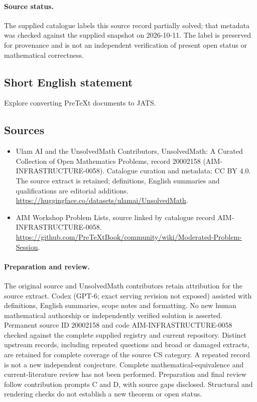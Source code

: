 \documentclass[11pt]{article}
\begin{document}
\paragraph{Source status.}
The supplied catalogue labels this source record partially solved; that metadata was checked against the supplied snapshot on 2026-10-11. The label is preserved for provenance and is not an independent verification of present open status or mathematical correctness.
\subsection{Short English statement}
Explore converting PreTeXt documents to JATS.
\subsection{Sources}
\begin{itemize}
\item[\hypertarget{source:20002158:1}{S1}] Ulam AI and the UnsolvedMath Contributors, UnsolvedMath: A Curated Collection of Open Mathematics Problems, record 20002158 (AIM-INFRASTRUCTURE-0058). Catalogue curation and metadata: CC BY 4.0. The source extract is retained; definitions, English summaries and qualifications are editorial additions.
\url{https://huggingface.co/datasets/ulamai/UnsolvedMath}.
\item[\hypertarget{source:20002158:2}{S2}] AIM Workshop Problem Lists, source linked by catalogue record AIM-INFRASTRUCTURE-0058.
\url{https://github.com/PreTeXtBook/community/wiki/Moderated-Problem-Session}.
\end{itemize}
\paragraph{Preparation and review.}
The original source and UnsolvedMath contributors retain attribution for the source extract. Codex (GPT-6; exact serving revision not exposed) assisted with definitions, English summaries, scope notes and formatting. No new human mathematical authorship or independently verified solution is asserted. Permanent source ID 20002158 and code AIM-INFRASTRUCTURE-0058 checked against the complete supplied registry and current repository. Distinct upstream records, including repeated questions and broad or damaged extracts, are retained for complete coverage of the source CS category. A repeated record is not a new independent conjecture. Complete mathematical-equivalence and current-literature review has not been performed. Preparation and final review follow contribution prompts C and D, with source gaps disclosed. Structural and rendering checks do not establish a new theorem or open status.
\label{end:20002158}
\end{document}

